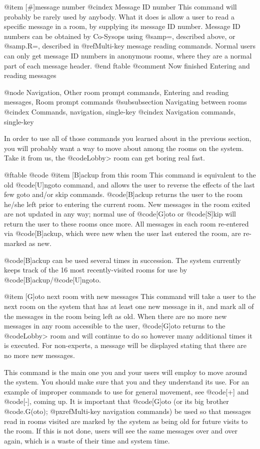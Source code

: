 @item [#]message number
@cindex Message ID number
This command will probably be rarely used by anybody.  What it does is
allow a user to read a specific message in a room, by supplying its
message ID number.  Message ID numbers can be obtained by Co-Sysops
using @samp{=}, described above, or @samp{.R=}, described in
@ref{Multi-key message reading commands}.
Normal users can only get message ID numbers in anonymous rooms, where
they are a normal part of each message header.
@end ftable
@comment Now finished Entering and reading messages

@node Navigation, Other room prompt commands, Entering and reading messages, Room prompt commands
@subsubsection Navigating between rooms
@cindex Commands, navigation, single-key
@cindex Navigation commands, single-key

In order to use all of those commands you learned about in the previous
section, you will probably want a way to move about among the rooms on
the system.  Take it from us, the @code{Lobby>} room can get boring real fast.

@ftable @code
@item [B]ackup from this room
This command is equivalent to the old @code{[U]ngoto} command,
and allows the user to reverse the effects of the
last few goto and/or skip commands.  @code{[B]ackup} returns the user to the
room he/she left prior to entering the current room.  New messages in the
room exited are not updated in any way; normal use of @code{[G]oto} or
@code{[S]kip} will return the user to these rooms once more.   All messages in
each room re-entered via @code{[B]ackup}, which were new when the user last
entered the room, are re-marked as new.

@code{[B]ackup} can be
used several times in succession.  The system currently keeps track of
the 16 most recently-visited rooms for use by @code{[B]ackup}/@code{[U]ngoto}.

@item [G]oto next room with new messages
This command will take a user to the next room on the
system that has at least one new message in it, and mark all of the
messages in the room being left as old.  When there are no more new
messages in any room accessible to the user, @code{[G]oto} returns to the
@code{Lobby>} room and will continue to do so however many additional
times it is executed.  For non-experts, a message will be displayed
stating that there are no more new messages.

This command is the main one you and your users will employ
to move around the system.  You should make sure that you and they
understand its use.  For an example of improper commands to use for
general movement, see @code{[+]} and @code{[-]}, coming up.  It is
important that @code{[G]oto}
(or its big brother @code{.G(oto)}; @pxref{Multi-key navigation commands})
be used so that messages read in rooms visited are marked by the
system as being old for future visits to the room.  If this is not
done, users will see the same messages over and over again, which
is a waste of their time and system time.

